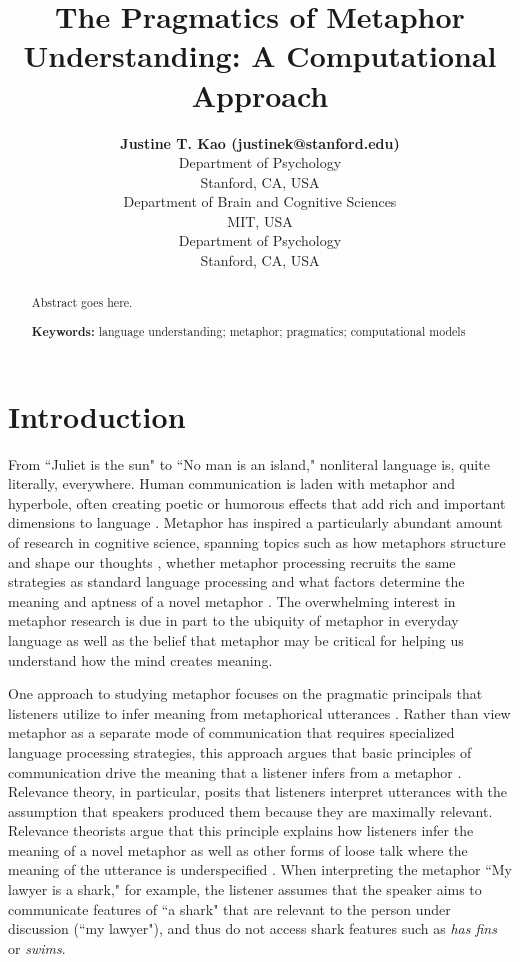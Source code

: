 \documentclass[10pt,letterpaper]{article}
\title{The Pragmatics of Metaphor Understanding: A Computational Approach}
\author{{\large \bf Justine T. Kao (justinek@stanford.edu)} \\
  Department of Psychology\\
  Stanford, CA, USA
   \AND {\large \bf Leon Bergen (bergen@mit.edu)} \\
  Department of Brain and Cognitive Sciences\\
 MIT, USA
  \AND {\large \bf Noah D. Goodman (ngoodman@stanford.edu)} \\
  Department of Psychology\\
  Stanford, CA, USA}
\begin{document}
\maketitle


\begin{abstract}
Abstract goes here.

\textbf{Keywords:} 
language understanding; metaphor; pragmatics; computational models
\end{abstract}


\section{Introduction}
From ``Juliet is the sun" to ``No man is an island," nonliteral language is, quite literally, everywhere. Human communication is laden with metaphor and hyperbole, often creating poetic or humorous effects that add rich and important dimensions to language \cite{glucksberg2001understanding, pilkington2000poetic, lakoff2009more, roberts1994people, bergen2003cognitive}. Metaphor has inspired a particularly abundant amount of research in cognitive science, spanning topics such as how metaphors structure and shape our thoughts \cite{ortony1993metaphor, lakoff1993contemporary, thibodeau2011metaphors}, whether metaphor processing recruits the same strategies as standard language processing \cite{giora1997understanding, ortony1978interpreting, gibbs2002new, glucksberg1993metaphors} and what factors determine the meaning and aptness of a novel metaphor \cite{blasko1993effects, tourangeau1981aptness, kintsch2002metaphor}. The overwhelming interest in metaphor research is due in part to the ubiquity of metaphor in everyday language as well as the belief that metaphor may be critical for helping us understand how the mind creates meaning. 

One approach to studying metaphor focuses on the pragmatic principals that listeners utilize to infer meaning from metaphorical utterances \cite{tendahl2008complementary, stern2000metaphor}. Rather than view metaphor as a separate mode of communication that requires specialized language processing strategies, this approach argues that basic principles of communication drive the meaning that a listener infers from a metaphor \cite{sperber2008deflationary}. Relevance theory, in particular, posits that listeners interpret utterances with the assumption that speakers produced them because they are maximally relevant. Relevance theorists argue that this principle explains how listeners infer the meaning of a novel metaphor as well as other forms of loose talk where the meaning of the utterance is underspecified \cite{wilson2002relevance, wilson2006metaphor, sperber1985loose}. When interpreting the metaphor ``My lawyer is a shark," for example, the listener assumes that the speaker aims to communicate features of  ``a shark" that are relevant to the person under discussion (``my lawyer"), and thus do not access shark features such as \emph{has fins} or \emph{swims}.
\end{document}
